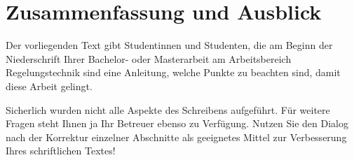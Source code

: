 \section {Zusammenfassung und Ausblick}

Der vorliegenden Text gibt Studentinnen und Studenten, die am
Beginn der Niederschrift Ihrer Bachelor- oder Masterarbeit am
Arbeitsbereich Regelungstechnik sind eine Anleitung, welche Punkte
zu beachten sind, damit diese Arbeit gelingt.


Sicherlich wurden nicht alle Aspekte des Schreibens aufgeführt.
Für weitere Fragen steht Ihnen ja Ihr Betreuer ebenso zu
Verfügung. Nutzen Sie den Dialog nach der Korrektur einzelner
Abschnitte als geeignetes Mittel zur Verbesserung Ihres
schriftlichen Textes!
